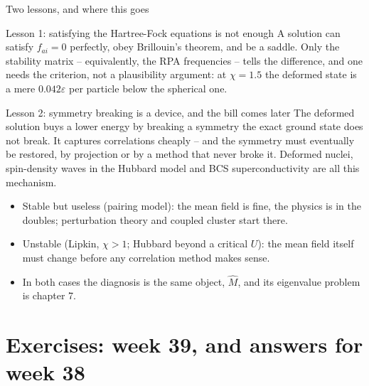 \documentclass[aspectratio=169,10pt]{beamer}
\begin{document}
\begin{frame}{Two lessons, and where this goes}
  \small
  \begin{block}{Lesson 1: satisfying the Hartree-Fock equations is not enough}
    A solution can satisfy $f_{ai}=0$ perfectly, obey Brillouin's theorem, and be a saddle. Only the stability matrix -- equivalently, the RPA frequencies -- tells the difference, and one needs the criterion, not a plausibility argument: at $\chi=1.5$ the deformed state is a mere $0.042\varepsilon$ per particle below the spherical one.
  \end{block}
  \begin{block}{Lesson 2: symmetry breaking is a device, and the bill comes later}
    The deformed solution buys a lower energy by breaking a symmetry the exact ground state does not break. It captures correlations cheaply -- and the symmetry must eventually be restored, by projection or by a method that never broke it. Deformed nuclei, spin-density waves in the Hubbard model and BCS superconductivity are all this mechanism.
  \end{block}
  \begin{itemize}
    \item Stable but useless (pairing model): the mean field is fine, the physics is in the doubles; perturbation theory and coupled cluster start there.
    \item Unstable (Lipkin, $\chi>1$; Hubbard beyond a critical $U$): the mean field itself must change before any correlation method makes sense.
    \item In both cases the diagnosis is the same object, $\hat{M}$, and its eigenvalue problem is chapter 7.
  \end{itemize}
\end{frame}

\section{Exercises: week 39, and answers for week 38}
\end{document}
